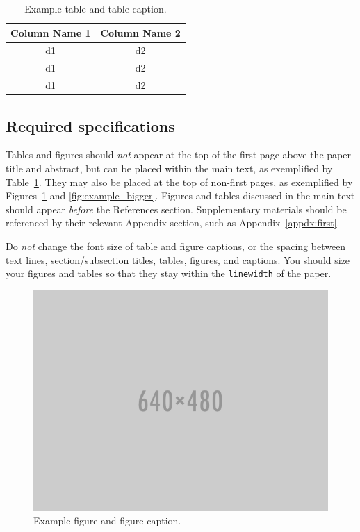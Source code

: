 \documentclass{anthology-ch}         %
\begin{document}
\begin{table}[h]
  \centering 
  \begin{tabular}{cc}
    \toprule
    Column Name 1 & Column Name 2\\
    \midrule
    d1 & d2 \\
    d1 & d2 \\
    d1 & d2 \\
    \bottomrule
  \end{tabular}
  \caption{Example table and table caption.}
  \label{tab:example}
\end{table}


\subsection{Required specifications}

Tables and figures should \textit{not} appear at the top of the first page above the paper title and abstract, but can be placed within the main text, as exemplified by Table~\ref{tab:example}. They may also be placed at the top of non-first pages, as exemplified by Figures~\ref{fig:example} and \ref{fig:example_bigger}. Figures and tables discussed in the main text should appear \textit{before} the References section. Supplementary materials should be referenced by their relevant Appendix section, such as Appendix~\ref{appdx:first}. 

Do \textit{not} change the font size of table and figure captions, or the spacing between text lines, section/subsection titles, tables, figures, and captions. You should size your figures and tables so that they stay within the \texttt{linewidth} of the paper. 

\begin{figure}[t!]
  \centering
  \includegraphics[width=0.4\linewidth]{640x480.png}
  \caption{Example figure and figure caption.}
  \label{fig:example}
\end{figure}
\end{document}
